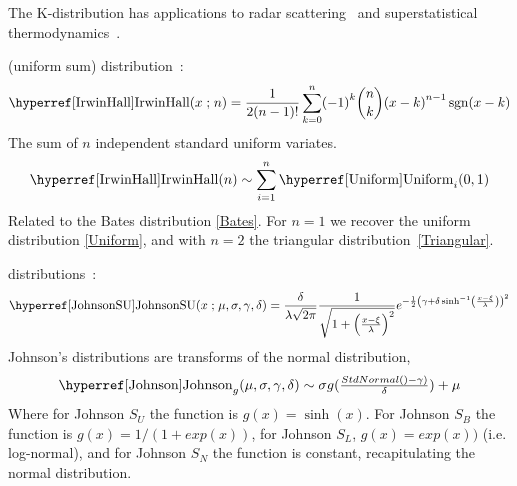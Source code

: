 %



The K-distribution has applications to radar scattering~\cite{Jakeman1978,Redding1999} and superstatistical thermodynamics~\cite[Eq.~21]{Dixit2013}.


\secbreak
 (uniform sum) distribution~\cite{Irwin1927, Hall1927, Johnson1995}:
\begin{align}
\label{IrwinHall}
\opr{IrwinHall} (x\given n) =\frac{1}{2\Left(n-1\Right)!}\sum_{k=0}^{n}\Left(-1\Right)^k\binom{n}{k}\Left(x-k\Right)^{n-1}\op{sgn}(x-k)
\checked
\end{align}
The sum of $n$ independent standard uniform variates. 
\[
\opr{IrwinHall}(n) \sim \sum_{i=1}^{n} \opr{Uniform}_i(0,1) \checked
\notag
\]
Related to the Bates distribution \eqref{Bates}. For $n=1$ we recover the uniform distribution \eqref{Uniform}, and with $n=2$ the triangular distribution~\eqref{Triangular}.

\secbreak
{} distributions~\cite{Johsnson1949a,Johnson1994}:
\[
\label{JohnsonSU}
\opr{JohnsonSU}(x\given\mu, \sigma, \gamma, \delta) = 
\frac{\delta}{\lambda\sqrt{2\pi}} \frac{1}{\sqrt{1 + \Left(\frac{x-\xi}{\lambda}\Right)^2}} e^{-\frac{1}{2}\Left(\gamma+\delta \sinh^{-1} \Left(\frac{x-\xi}{\lambda}\Right)\Right)^2}
\]
Johnson's distributions are transforms of the normal distribution, 
\[
\opr{Johnson}_g(\mu, \sigma, \gamma, \delta) \sim \sigma g(\tfrac{StdNormal()-\gamma)}{\delta}) + \mu
\notag
\]
Where for Johnson $S_U$ the function is $g(x)=\sinh(x)$.
For Johnson $S_B$ the function is $g(x)=1/(1+exp(x))$, for Johnson $S_L$, $g(x)=exp(x))$ (i.e. log-normal), and for Johnson $S_N$ the function is constant, recapitulating the normal distribution.



